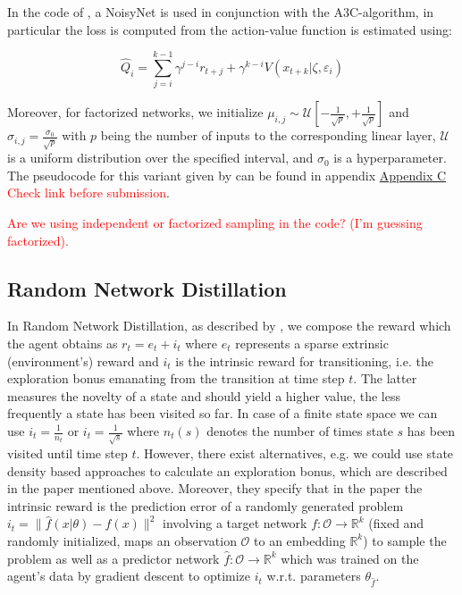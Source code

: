 \documentclass[10pt]{article} %
\begin{document}
\noindent In the code of \cite{rle-paper}, a NoisyNet is used in conjunction with the A3C-algorithm, in particular the loss is computed from the action-value function is estimated using:

\begin{equation}
  \hat{Q}_{i} = \sum_{j=i}^{k-1} \gamma^{j-i} r_{t+j} + \gamma^{k-i} V(x_{t+k} | \zeta, \varepsilon_{i})
\end{equation}

Moreover, for factorized networks, we initialize $\mu_{i,j} \sim \mathcal{U}\left[-\frac{1}{\sqrt{p}}, +\frac{1}{\sqrt{p}}\right]$ and $\sigma_{i,j} = \frac{\sigma_{0}}{\sqrt{p}}$ with $p$ being the number of inputs to the corresponding linear layer, $\mathcal{U}$ is a uniform distribution over the specified interval, and $\sigma_{0}$ is a hyperparameter. The pseudocode for this variant given by \cite{noisynet-paper} can be found in appendix \hyperlink{algo-noisynet}{Appendix C} \textcolor{red}{Check link before submission}.

\textcolor{red}{Are we using independent or factorized sampling in the code? (I'm guessing factorized).}

\subsection{Random Network Distillation}

In Random Network Distillation, as described by \cite{rnd-paper}, we compose the reward which the agent obtains as $r_{t} = e_{t} + i_{t}$ where $e_{t}$ represents a sparse extrinsic (environment's) reward and $i_{t}$ is the intrinsic reward for transitioning, i.e. the exploration bonus emanating from the transition at time step $t$. The latter measures the novelty of a state and should yield a higher value, the less frequently a state has been visited so far. In case of a finite state space we can use $i_{t} = \frac{1}{n_{t}}$ or $i_{t} = \frac{1}{\sqrt{s}}$ where $n_{t}(s)$ denotes the number of times state $s$ has been visited until time step $t$. However, there exist alternatives, e.g. we could use state density based approaches to calculate an exploration bonus, which are described in the paper mentioned above. Moreover, they specify that in the paper the intrinsic reward is the prediction error of a randomly generated problem $i_{t} = \|\hat{f}(x|\theta) - f(x)\|^{2}$ involving a target network $f: \mathcal{O} \rightarrow \mathbb{R}^{k}$ (fixed and randomly initialized, maps an observation $\mathcal{O}$ to an embedding $\mathbb{R}^{k}$) to sample the problem as well as a predictor network $\hat{f}: \mathcal{O} \rightarrow \mathbb{R}^{k}$ which was trained on the agent's data by gradient descent to optimize $i_{t}$ w.r.t. parameters $\theta_{\hat{f}}$.
\end{document}
